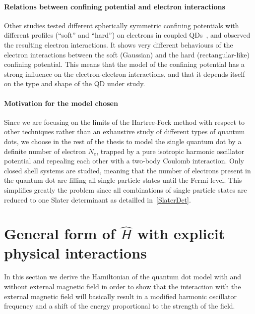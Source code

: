 
\paragraph{Relations between confining potential and electron interactions} Other studies tested different spherically symmetric confining potentials with different profiles (``soft'' and ``hard'') on electrons in coupled QDs~\cite{Kwasniowski2008}, and observed the resulting electron interactions. It shows very different behaviours of the electron interactions between the soft (Gaussian) and the hard (rectangular-like) confining potential. This means that the model of the confining potential has a strong influence on the electron-electron interactions, and that it depends itself on the type and shape of the QD under study.

\paragraph{Motivation for the model chosen} Since we are focusing on the limits of the Hartree-Fock method %
with respect to other techniques rather than an exhaustive study of different types of quantum dots, we choose in the rest of the thesis to model the single quantum dot by a definite number of electron $N_e$, trapped by a pure isotropic harmonic oscillator potential and repealing each other with a two-body Coulomb interaction. Only closed shell systems are studied, meaning that the number of electrons present in the quantum dot are filling all single particle states until the Fermi level. This simplifies greatly the problem since all combinations of single particle states are reduced to one Slater determinant as detailled in~\ref{SlaterDet}.


\section{General form of $\hat{H}$ with explicit physical interactions}
\label{sec:HamiltonianScaling}
In this section we derive the Hamiltonian of the quantum dot model with and without external magnetic field in order to show that the interaction with the external magnetic field will basically result in a modified harmonic oscillator frequency and a shift of the energy proportional to the strength of the field.

